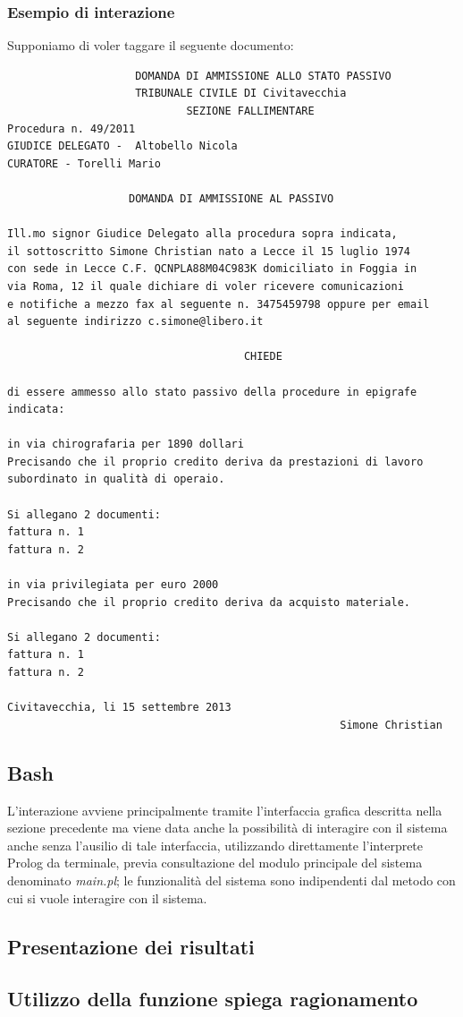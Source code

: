 	\subsubsection{Esempio di interazione}
	Supponiamo di voler taggare il seguente documento:
	\small
	\begin{verbatim}
	                DOMANDA DI AMMISSIONE ALLO STATO PASSIVO
                    TRIBUNALE CIVILE DI Civitavecchia
                            SEZIONE FALLIMENTARE
Procedura n. 49/2011
GIUDICE DELEGATO -  Altobello Nicola
CURATORE - Torelli Mario
                   
                   DOMANDA DI AMMISSIONE AL PASSIVO

Ill.mo signor Giudice Delegato alla procedura sopra indicata, 
il sottoscritto Simone Christian nato a Lecce il 15 luglio 1974 
con sede in Lecce C.F. QCNPLA88M04C983K domiciliato in Foggia in 
via Roma, 12 il quale dichiare di voler ricevere comunicazioni 
e notifiche a mezzo fax al seguente n. 3475459798 oppure per email 
al seguente indirizzo c.simone@libero.it

                                     CHIEDE

di essere ammesso allo stato passivo della procedure in epigrafe indicata:

in via chirografaria per 1890 dollari 
Precisando che il proprio credito deriva da prestazioni di lavoro 
subordinato in qualità di operaio.

Si allegano 2 documenti:
fattura n. 1
fattura n. 2

in via privilegiata per euro 2000 
Precisando che il proprio credito deriva da acquisto materiale.

Si allegano 2 documenti:
fattura n. 1
fattura n. 2

Civitavecchia, li 15 settembre 2013
                                                    Simone Christian
	\end{verbatim}

\subsection{Bash}
L’interazione avviene principalmente tramite l'interfaccia grafica descritta nella sezione precedente ma viene data anche la possibilità di interagire con il sistema anche senza l'ausilio di tale interfaccia, utilizzando direttamente l'interprete Prolog da terminale, previa consultazione del modulo principale del sistema denominato \emph{main.pl}; le funzionalità del sistema sono indipendenti dal metodo con cui si vuole interagire con il sistema.

\subsection{Presentazione dei risultati}

\subsection{Utilizzo della funzione spiega ragionamento}
